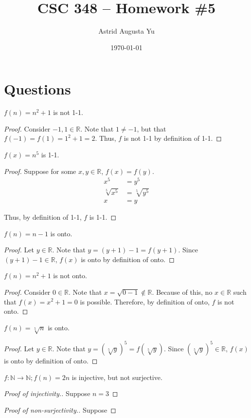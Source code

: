 \documentclass{article}
\author{Astrid Augusta Yu}
\title{CSC 348 -- Homework \#5}
\date{\today}
\begin{document}
\maketitle
\tableofcontents

\section{Questions}
\begin{outline}[enumerate]
    \1 $f(n) = n^2 + 1$ is not 1-1.
        \begin{proof}
            Consider $-1, 1 \in \mathbb{R}$. Note that $1 \neq -1$, but that $f(-1) = f(1) = 1^2 + 1 = 2$. Thus, $f$ is not 1-1 by definition of 1-1.
        \end{proof}
    \1 $f(x) = n^5$ is 1-1.
        \begin{proof}
            Suppose for some $x, y \in \mathbb{R}$, $f(x) = f(y)$.
            \begin{equation}
                \begin{aligned}
                    x^5 &= y^5 \\
                    \sqrt[5]{x^5} &= \sqrt[5]{y^5} \\
                    x &= y
                \end{aligned}
            \end{equation}

            Thus, by definition of 1-1, $f$ is 1-1.
        \end{proof}
    \1 $f(n) = n - 1$ is onto.
        \begin{proof}
            Let $y \in \mathbb{R}$. Note that $y = (y + 1) - 1 = f(y + 1)$. Since $(y + 1) - 1 \in \mathbb{R}$, $f(x)$ is onto by definition of onto.
        \end{proof}
    \1 $f(n) = n^2 + 1$ is not onto.
        \begin{proof}
            Consider $0 \in \mathbb{R}$. Note that $x = \sqrt{0 - 1} \notin \mathbb{R}$. Because of this, no $x \in \mathbb{R}$ such that $f(x) = x^2 + 1 = 0$ is possible. Therefore, by definition of onto, $f$ is not onto.
        \end{proof}
    \1 $f(n) = \sqrt[5]{n}$ is onto.
        \begin{proof}
            Let $y \in \mathbb{R}$. Note that $y = \left(\sqrt[5]{y}\right)^5 = f\left(\sqrt[5]{y}\right)$. Since $(\sqrt[5]{y})^5 \in \mathbb{R}$, $f(x)$ is onto by definition of onto.
        \end{proof}
    \1 $f: \mathbb{N} \rightarrow \mathbb{N}; f(n) = 2n$ is injective, but not surjective.
    \begin{proof}[Proof of injectivity.]
        Suppose $n = 3$
    \end{proof}
    \begin{proof}[Proof of non-surjectivity.]
        Suppose 
    \end{proof}


\end{outline}
\end{document}
